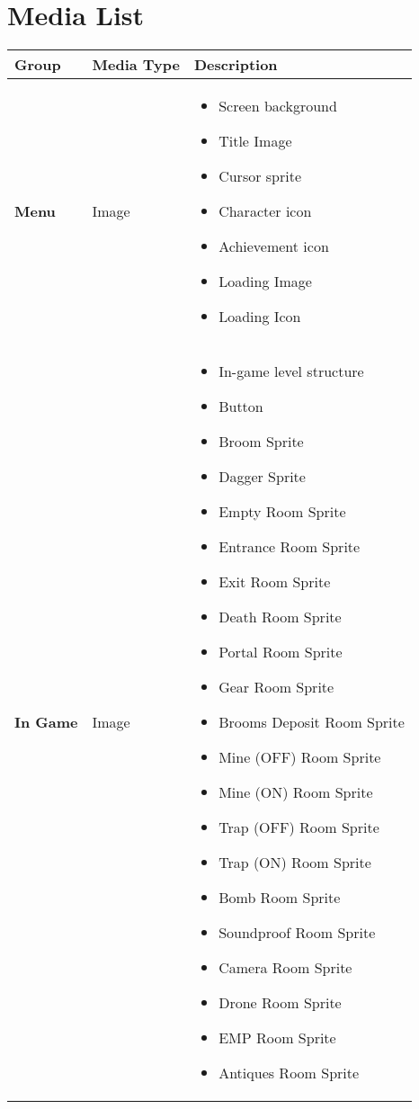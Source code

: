 \section{Media List}

\begin{tabular}{|m{3cm}|m{3cm}|m{7cm}|}
	\hline
	\textbf{Group} & \textbf{Media Type} & \textbf{Description}\\
	\hline
	 \textbf{Menu}& Image & 
	 \begin{itemize}
	 	\item Screen background
	 	\item Title Image
	 	\item Cursor sprite
	 	\item Character icon
	 	\item Achievement icon
	 	\item Loading Image
	 	\item Loading Icon
	 \end{itemize}
	 	\\
    \hline
     \textbf{In Game}& Image & 
     \begin{itemize}
     	\item In-game level structure
     	\item Button
     	\item Broom Sprite
     	\item Dagger Sprite
     	\item Empty Room Sprite
     	\item Entrance Room Sprite
     	\item Exit Room Sprite
     	\item Death Room Sprite
     	\item Portal Room Sprite
     	\item Gear Room Sprite
     	\item Brooms Deposit Room Sprite
     	\item Mine (OFF) Room Sprite
     	\item Mine (ON) Room Sprite
     	\item Trap (OFF) Room Sprite
     	\item Trap (ON) Room Sprite
     	\item Bomb Room Sprite
     	\item Soundproof Room Sprite
     	\item Camera Room Sprite
     	\item Drone Room Sprite
     	\item EMP Room Sprite
     	\item Antiques Room Sprite
     \end{itemize}
 		\\
		\hline
\end{tabular}
   	
